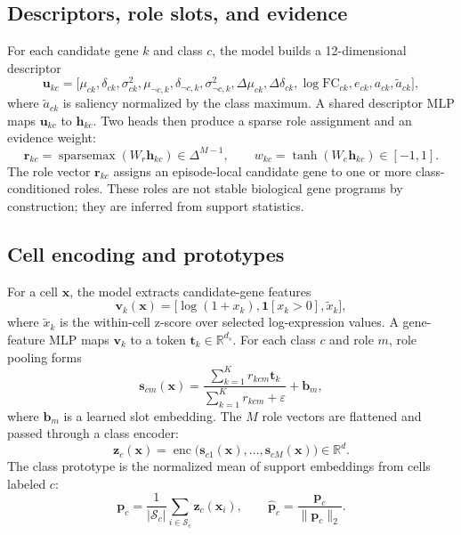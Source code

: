 \documentclass{article}
\newcommand{\R}{\mathbb{R}}
\newcommand{\eps}{\varepsilon}
\newcommand{\sparsemax}{\operatorname{sparsemax}}
\begin{document}
\subsection{Descriptors, role slots, and evidence}

For each candidate gene \(k\) and class \(c\), the model builds a 12-dimensional descriptor
\begin{equation}
\mathbf{u}_{kc}=\bigl[\mu_{ck},\delta_{ck},\sigma^2_{ck},\mu_{\neg c,k},\delta_{\neg c,k},\sigma^2_{\neg c,k},
\Delta\mu_{ck},\Delta\delta_{ck},\log\mathrm{FC}_{ck},e_{ck},a_{ck},\tilde a_{ck}\bigr],
\end{equation}
where \(\tilde a_{ck}\) is saliency normalized by the class maximum. A shared descriptor MLP maps \(\mathbf{u}_{kc}\) to \(\mathbf{h}_{kc}\). Two heads then produce a sparse role assignment and an evidence weight:
\begin{equation}
    \mathbf{r}_{kc}=\sparsemax(W_r\mathbf{h}_{kc})\in\Delta^{M-1},
    \qquad
    w_{kc}=\tanh(W_e\mathbf{h}_{kc})\in[-1,1].
\end{equation}
The role vector \(\mathbf{r}_{kc}\) assigns an episode-local candidate gene to one or more class-conditioned roles. These roles are not stable biological gene programs by construction; they are inferred from support statistics.

\subsection{Cell encoding and prototypes}

For a cell \(\mathbf{x}\), the model extracts candidate-gene features
\begin{equation}
    \mathbf{v}_k(\mathbf{x})=\bigl[\log(1+x_k),\mathbf{1}[x_k>0],\tilde{x}_k\bigr],
\end{equation}
where \(\tilde{x}_k\) is the within-cell z-score over selected log-expression values. A gene-feature MLP maps \(\mathbf{v}_k\) to a token \(\mathbf{t}_k\in\R^{d_s}\). For each class \(c\) and role \(m\), role pooling forms
\begin{equation}
    \mathbf{s}_{cm}(\mathbf{x})=\frac{\sum_{k=1}^{K}r_{kcm}\mathbf{t}_k}{\sum_{k=1}^{K}r_{kcm}+\eps}+\mathbf{b}_m,
\end{equation}
where \(\mathbf{b}_m\) is a learned slot embedding. The \(M\) role vectors are flattened and passed through a class encoder:
\begin{equation}
    \mathbf{z}_c(\mathbf{x})=\operatorname{enc}\bigl(\mathbf{s}_{c1}(\mathbf{x}),\ldots,\mathbf{s}_{cM}(\mathbf{x})\bigr)\in\R^d.
\end{equation}
The class prototype is the normalized mean of support embeddings from cells labeled \(c\):
\begin{equation}
    \mathbf{p}_c=\frac{1}{|\mathcal{S}_c|}\sum_{i\in\mathcal{S}_c}\mathbf{z}_c(\mathbf{x}_i),
    \qquad
    \hat{\mathbf{p}}_c=\frac{\mathbf{p}_c}{\|\mathbf{p}_c\|_2}.
\end{equation}
\end{document}
